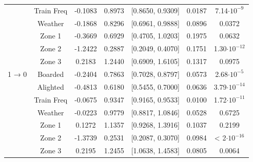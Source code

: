 \documentclass[11pt]{article}
\begin{document}
\begin{table}[htbp]
{\begin{tabular}{|l|c|c|c|c|c|c|}
 & Train Freq & -0.1083 & 0.8973 & [0.8650, 0.9309] & 0.0187 & 7.14\(\cdot10^{-9}\)\\
 & Weather & -0.1868 & 0.8296 & [0.6961, 0.9888] & 0.0896 & 0.0372\\
 & Zone 1 & -0.3669 & 0.6929 & [0.4705, 1.0203] & 0.1975 & 0.0632\\
 & Zone 2 & -1.2422 & 0.2887 & [0.2049, 0.4070] & 0.1751 & 1.30\(\cdot10^{-12}\)\\
 & Zone 3 & 0.2183 & 1.2440 & [0.6909, 1.6105] & 0.1317 & 0.0975\\
 \hline
 1 → 0 & Boarded & -0.2404 & 0.7863 & [0.7028, 0.8797] & 0.0573 & 2.68\(\cdot10^{-5}\) \\
 & Alighted & -0.4813 & 0.6180 & [0.5455, 0.7000] & 0.0636 & 3.79\(\cdot10^{-14}\)\\
 & Train Freq & -0.0675 & 0.9347 & [0.9165, 0.9533] & 0.0100 & 1.72\(\cdot10^{-11}\)\\
 & Weather & -0.0223 & 0.9779 & [0.8817, 1.0846] & 0.0528 & 0.6725\\
 & Zone 1 & 0.1272 & 1.1357 & [0.9268, 1.3916] & 0.1037 & 0.2199\\
 & Zone 2 & -1.3739 & 0.2531 & [0.2087, 0.3070] & 0.0984 & < 2\(\cdot10^{-16}\)\\
 & Zone 3 & 0.2195 & 1.2455 & [1.0638, 1.4583] & 0.0805 & 0.0064\\
\hline
\end{tabular}
}
\end{table}
\end{document}
